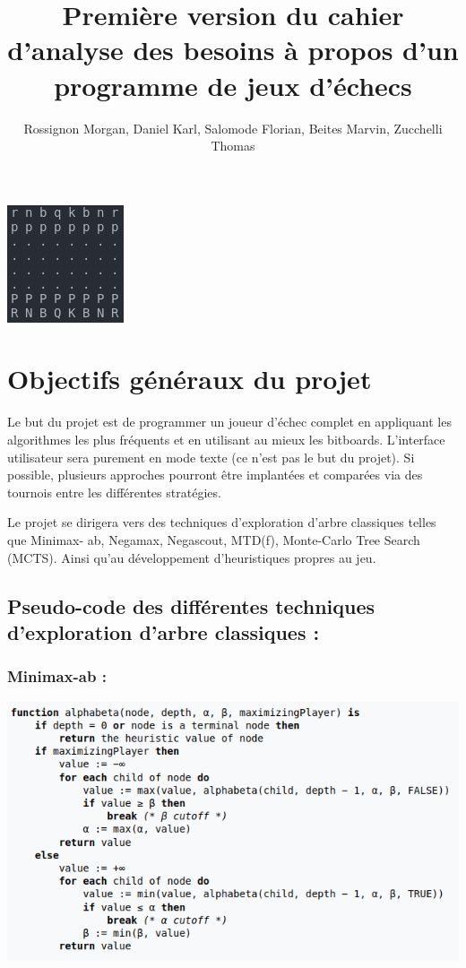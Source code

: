 \documentclass{article}
\title{Première version du cahier d’analyse des besoins à propos d'un programme de jeux d'échecs}
\author{Rossignon Morgan, Daniel Karl, Salomode Florian, Beites Marvin, Zucchelli Thomas}
\begin{document}
\maketitle
\centerline{\includegraphics[scale = 1]{echecs_title.png}}

\tableofcontents
\newpage

\section{Objectifs généraux du projet}
Le but du projet est de programmer un joueur d'échec complet en appliquant les algorithmes les plus fréquents et en utilisant au mieux les bitboards. L'interface utilisateur sera purement en mode texte (ce n'est pas le but du projet). Si possible, plusieurs approches pourront être implantées et comparées via des tournois entre les différentes stratégies.

Le projet se dirigera vers des techniques d'exploration d'arbre classiques telles que Minimax-
ab, Negamax, Negascout, MTD(f), Monte-Carlo Tree Search (MCTS). Ainsi qu'au développement d'heuristiques propres au jeu.

\subsection{Pseudo-code des différentes techniques d'exploration d'arbre classiques : }
\medskip
\subsubsection{Minimax-ab :}
\centerline{\includegraphics[scale = 0.5]{Alpha_beta_minmax.png}}
\medskip
\end{document}
